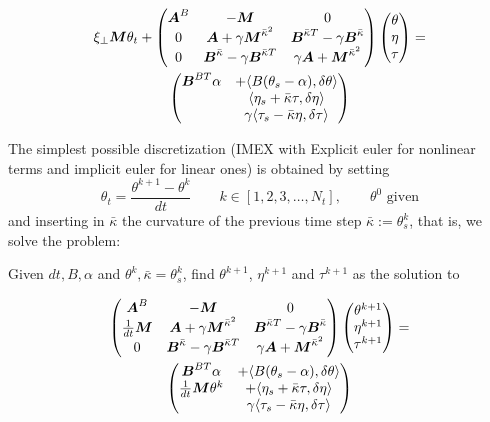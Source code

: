 \begin{multline}
\label{eq:4}
\xi_\perp\vv M \theta_t + 
\begin{pmatrix}
\vv A^B &  -\vv M & 0 \\
0 & 
 \vv A
+ \gamma \vv M^{\bar \kappa^2} &
 \vv B^{\bar\kappa T}
- \gamma\vv B^{\bar\kappa} \\
0 & 
 \vv B^{\bar\kappa}
- \gamma\vv B^{\bar\kappa T} 
&
%
%
\gamma \vv A
+ \vv M^{\bar \kappa^2}
\end{pmatrix}
%
\begin{pmatrix}
\theta\phantom{\big|\!\!}\\
\eta\phantom{\big|\!\!} \\
\tau\phantom{\big|\!\!}
\end{pmatrix}
=\\
\begin{pmatrix}
\vv B^{BT}\alpha & +\langle B(\theta_s-\alpha), \delta \theta\rangle\\
& \langle \eta_s+\bar\kappa\tau,\delta\eta\rangle
\\
&\gamma\langle\tau_{s}-\bar \kappa\eta, \delta\tau\rangle 
\end{pmatrix}
\end{multline}

The simplest possible discretization (IMEX with Explicit euler for
nonlinear terms and implicit euler for linear ones) is obtained by
setting
$$
\theta_t = \frac{\theta^{k+1} - \theta^k}{dt} \qquad k \in
[1,2,3,\ldots, N_t], \qquad \theta^0 \text{ given}
$$
and inserting in $\bar \kappa$ the curvature of the previous time step
$\bar \kappa := \theta^k_s$, that is, we solve the problem:

Given $dt, B, \alpha$ and $\theta^k, \bar \kappa = \theta^k_s$, find
$\theta^{k+1}$, $\eta^{k+1}$ and $\tau^{k+1}$ as the solution to

\begin{multline}
\label{eq:4}
\begin{pmatrix}
\vv A^B &  -\vv M & 0 \\
\frac{1}{dt} \vv M& 
 \vv A
+ \gamma \vv M^{\bar \kappa^2} &
 \vv B^{\bar\kappa T}
- \gamma\vv B^{\bar\kappa} \\
0 & 
 \vv B^{\bar\kappa}
- \gamma\vv B^{\bar\kappa T} 
&
%
%
\gamma \vv A
+ \vv M^{\bar \kappa^2}
\end{pmatrix}
%
\begin{pmatrix}
\theta^{k+1}\phantom{\big|\!\!}\\
\eta^{k+1}\phantom{\big|\!\!} \\
\tau^{k+1}\phantom{\big|\!\!}
\end{pmatrix}
=\\
\begin{pmatrix}
\vv B^{BT}\alpha & +\langle B(\theta_s-\alpha), \delta \theta\rangle\\
\frac{1}{dt} \vv M \theta^k& +\langle \eta_s+\bar\kappa\tau,\delta\eta\rangle
\\
&\gamma\langle\tau_{s}-\bar \kappa\eta, \delta\tau\rangle 
\end{pmatrix}
\end{multline}

